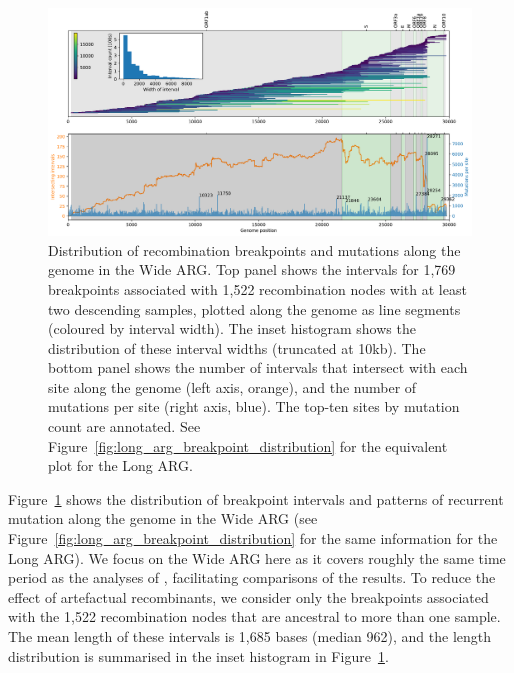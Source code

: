 \documentclass{article}
\begin{document}
\begin{figure}
\centering
\includegraphics[width=\textwidth]{figures/wide_arg_recombination_intervals.pdf}
\caption{\label{fig:breakpoint-distribution}
Distribution of recombination breakpoints and mutations along the genome in
the Wide ARG. Top panel shows the intervals for 1,769 breakpoints associated
with 1,522 recombination nodes with at least two descending samples, plotted along the genome
as line segments (coloured by interval width). The inset histogram shows the
distribution of these interval widths (truncated at 10kb).
The bottom panel shows the number of intervals that intersect with
each site along the genome (left axis, orange), and the number of mutations
per site (right axis, blue).
The top-ten sites by mutation count are annotated.
See Figure~\ref{fig:long_arg_breakpoint_distribution} for the equivalent plot
for the Long ARG.}
\end{figure}

Figure~\ref{fig:breakpoint-distribution} shows the distribution of breakpoint
intervals and patterns of recurrent mutation along the genome in the Wide ARG
(see Figure~\ref{fig:long_arg_breakpoint_distribution} for the same information
for the Long ARG). We focus on the Wide ARG here as it covers roughly the same time
period as the analyses of \cite{Turakhia2022-it}, facilitating comparisons
of the results. To reduce the effect of artefactual recombinants, we
consider only the breakpoints associated with the 1,522 recombination nodes
that are ancestral to more than one sample. The mean length of these intervals
is 1,685 bases (median 962), and the length distribution is summarised in the
inset histogram in Figure~\ref{fig:breakpoint-distribution}.
\end{document}
